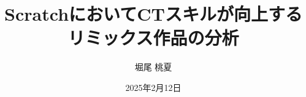 \documentclass[11pt]{jreport}
\title{ScratchにおいてCTスキルが向上する\\リミックス作品の分析}
\author{堀尾 桃夏}
\date{2025年2月12日}
\newcommand{\todo}[1]{\colorbox{yellow}{{\bf TODO}:}{\color{red} {\textbf{[#1]}}}}  %
\begin{document}
\maketitle

\begin{abstract}





\end{abstract}

\tableofcontents


\end{document}
